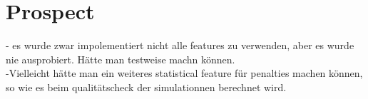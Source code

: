 \chapter{Prospect}
- es wurde zwar impolementiert nicht alle features zu verwenden, aber es wurde nie ausprobiert. Hätte man testweise machn können. \\
-Vielleicht hätte man ein weiteres statistical feature für penalties machen können, so wie es beim qualitätscheck der simulationnen berechnet wird.\\



